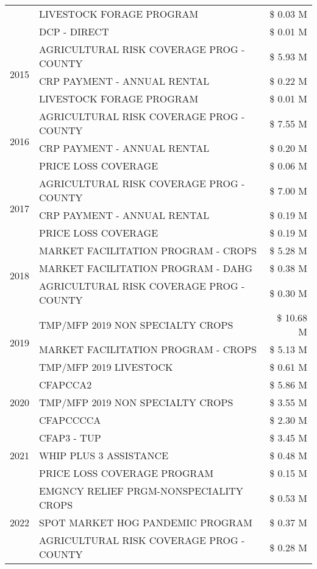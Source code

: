 \begin{tabular}{llr}
 & LIVESTOCK FORAGE PROGRAM & \$ 0.03 M \\
 & DCP - DIRECT & \$ 0.01 M \\
\cline{1-3}
\multirow[t]{3}{*}{2015} & AGRICULTURAL RISK COVERAGE PROG - COUNTY & \$ 5.93 M \\
 & CRP PAYMENT - ANNUAL RENTAL & \$ 0.22 M \\
 & LIVESTOCK FORAGE PROGRAM & \$ 0.01 M \\
\cline{1-3}
\multirow[t]{3}{*}{2016} & AGRICULTURAL RISK COVERAGE PROG - COUNTY & \$ 7.55 M \\
 & CRP PAYMENT - ANNUAL RENTAL & \$ 0.20 M \\
 & PRICE LOSS COVERAGE & \$ 0.06 M \\
\cline{1-3}
\multirow[t]{3}{*}{2017} & AGRICULTURAL RISK COVERAGE PROG - COUNTY & \$ 7.00 M \\
 & CRP PAYMENT - ANNUAL RENTAL & \$ 0.19 M \\
 & PRICE LOSS COVERAGE & \$ 0.19 M \\
\cline{1-3}
\multirow[t]{3}{*}{2018} & MARKET FACILITATION PROGRAM - CROPS & \$ 5.28 M \\
 & MARKET FACILITATION PROGRAM - DAHG & \$ 0.38 M \\
 & AGRICULTURAL RISK COVERAGE PROG - COUNTY & \$ 0.30 M \\
\cline{1-3}
\multirow[t]{3}{*}{2019} & TMP/MFP 2019 NON SPECIALTY CROPS & \$ 10.68 M \\
 & MARKET FACILITATION PROGRAM - CROPS & \$ 5.13 M \\
 & TMP/MFP 2019 LIVESTOCK & \$ 0.61 M \\
\cline{1-3}
\multirow[t]{3}{*}{2020} & CFAPCCA2 & \$ 5.86 M \\
 & TMP/MFP 2019 NON SPECIALTY CROPS & \$ 3.55 M \\
 & CFAPCCCCA & \$ 2.30 M \\
\cline{1-3}
\multirow[t]{3}{*}{2021} & CFAP3 - TUP & \$ 3.45 M \\
 & WHIP PLUS 3 ASSISTANCE & \$ 0.48 M \\
 & PRICE LOSS COVERAGE PROGRAM & \$ 0.15 M \\
\cline{1-3}
\multirow[t]{3}{*}{2022} & EMGNCY RELIEF PRGM-NONSPECIALITY CROPS & \$ 0.53 M \\
 & SPOT MARKET HOG PANDEMIC PROGRAM & \$ 0.37 M \\
 & AGRICULTURAL RISK COVERAGE PROG - COUNTY & \$ 0.28 M \\
\cline{1-3}
\bottomrule
\end{tabular}
